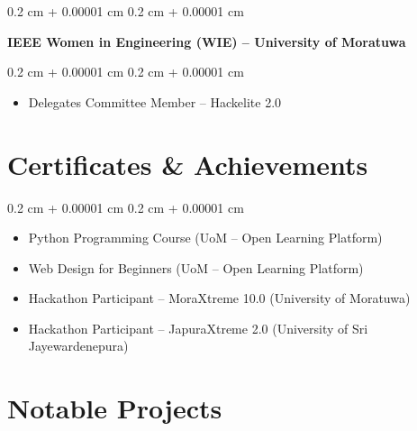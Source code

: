 \documentclass[10pt, letterpaper]{article}
\newenvironment{highlights}{
	\vspace{0.05 cm}
	\begin{itemize}[
		topsep=0.10 cm,
		parsep=0.10 cm,
		partopsep=0pt,
		itemsep=0pt,
		leftmargin=0.4 cm + 10pt
		]
	}{
	\end{itemize}
}
\newenvironment{highlightsforbulletentries}{
	\begin{itemize}[
		topsep=0.10 cm,
		parsep=0.10 cm,
		partopsep=0pt,
		itemsep=0pt,
		leftmargin=10pt
		]
	}{
	\end{itemize}
}
\newenvironment{onecolentry}{
	\begin{adjustwidth}{
			0.2 cm + 0.00001 cm
		}{
			0.2 cm + 0.00001 cm
		}
	}{
	\end{adjustwidth}
}
\begin{document}
	\vspace{0.25 cm}

	\begin{onecolentry}
		\textbf{IEEE Women in Engineering (WIE) -- University of Moratuwa}
	\end{onecolentry}
	\begin{onecolentry}
		\begin{highlights}
			\item Delegates Committee Member -- Hackelite 2.0
		\end{highlights}
	\end{onecolentry}


	\section{Certificates \& Achievements}

	\begin{onecolentry}
		\begin{highlightsforbulletentries}
			\item Python Programming Course (UoM -- Open Learning Platform)
			\item Web Design for Beginners (UoM -- Open Learning Platform)
			\item Hackathon Participant -- MoraXtreme 10.0 (University of Moratuwa)
			\item Hackathon Participant -- JapuraXtreme 2.0 (University of Sri Jayewardenepura)
		\end{highlightsforbulletentries}
	\end{onecolentry}


	\section{Notable Projects}
\end{document}
